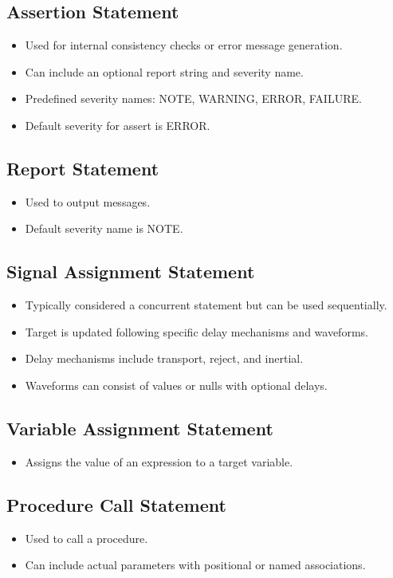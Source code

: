 \documentclass[a4paper,12pt]{article}
\begin{document}
	\subsection*{Assertion Statement}
	\begin{itemize}
		\item Used for internal consistency checks or error message generation.
		\item Can include an optional report string and severity name.
		\item Predefined severity names: NOTE, WARNING, ERROR, FAILURE.
		\item Default severity for assert is ERROR.
	\end{itemize}
	
	\subsection*{Report Statement}
	\begin{itemize}
		\item Used to output messages.
		\item Default severity name is NOTE.
	\end{itemize}
	
	\subsection*{Signal Assignment Statement}
	\begin{itemize}
		\item Typically considered a concurrent statement but can be used sequentially.
		\item Target is updated following specific delay mechanisms and waveforms.
		\item Delay mechanisms include transport, reject, and inertial.
		\item Waveforms can consist of values or nulls with optional delays.
	\end{itemize}
	
	\subsection*{Variable Assignment Statement}
	\begin{itemize}
		\item Assigns the value of an expression to a target variable.
	\end{itemize}
	
	\subsection*{Procedure Call Statement}
	\begin{itemize}
		\item Used to call a procedure.
		\item Can include actual parameters with positional or named associations.
	\end{itemize}
	
\end{document}
